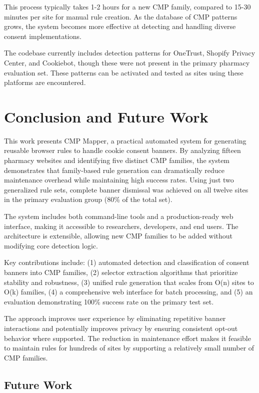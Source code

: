 \documentclass[conference]{IEEEtran}
\begin{document}
This process typically takes 1-2 hours for a new CMP family, compared to 15-30 minutes per site for manual rule creation. As the database of CMP patterns grows, the system becomes more effective at detecting and handling diverse consent implementations.

The codebase currently includes detection patterns for OneTrust, Shopify Privacy Center, and Cookiebot, though these were not present in the primary pharmacy evaluation set. These patterns can be activated and tested as sites using these platforms are encountered.

\section{Conclusion and Future Work}

This work presents CMP Mapper, a practical automated system for generating reusable browser rules to handle cookie consent banners. By analyzing fifteen pharmacy websites and identifying five distinct CMP families, the system demonstrates that family-based rule generation can dramatically reduce maintenance overhead while maintaining high success rates. Using just two generalized rule sets, complete banner dismissal was achieved on all twelve sites in the primary evaluation group (80\% of the total set).

The system includes both command-line tools and a production-ready web interface, making it accessible to researchers, developers, and end users. The architecture is extensible, allowing new CMP families to be added without modifying core detection logic.

Key contributions include: (1) automated detection and classification of consent banners into CMP families, (2) selector extraction algorithms that prioritize stability and robustness, (3) unified rule generation that scales from O(n) sites to O(k) families, (4) a comprehensive web interface for batch processing, and (5) an evaluation demonstrating 100\% success rate on the primary test set.

The approach improves user experience by eliminating repetitive banner interactions and potentially improves privacy by ensuring consistent opt-out behavior where supported. The reduction in maintenance effort makes it feasible to maintain rules for hundreds of sites by supporting a relatively small number of CMP families.

\subsection{Future Work}
\end{document}
